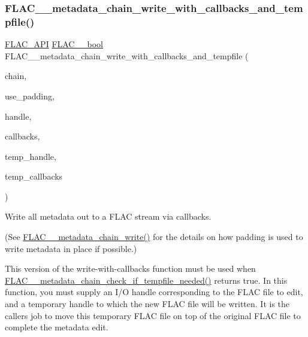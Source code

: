 \subsubsection{\texorpdfstring{F\+L\+A\+C\+\_\+\+\_\+metadata\+\_\+chain\+\_\+write\+\_\+with\+\_\+callbacks\+\_\+and\+\_\+tempfile()}{FLAC\_\_metadata\_chain\_write\_with\_callbacks\_and\_tempfile()}}
{\footnotesize\ttfamily \hyperlink{group__flac__export_ga56ca07df8a23310707732b1c0007d6f5}{F\+L\+A\+C\+\_\+\+A\+PI} \hyperlink{ordinals_8h_a95103469f1cbd78b8cf250194985b34e}{F\+L\+A\+C\+\_\+\+\_\+bool} F\+L\+A\+C\+\_\+\+\_\+metadata\+\_\+chain\+\_\+write\+\_\+with\+\_\+callbacks\+\_\+and\+\_\+tempfile (\begin{DoxyParamCaption}\item[{\hyperlink{group__flac__metadata__level2_gaec6993c60b88f222a52af86f8f47bfdf}{F\+L\+A\+C\+\_\+\+\_\+\+Metadata\+\_\+\+Chain} $\ast$}]{chain,  }\item[{\hyperlink{ordinals_8h_a95103469f1cbd78b8cf250194985b34e}{F\+L\+A\+C\+\_\+\+\_\+bool}}]{use\+\_\+padding,  }\item[{\hyperlink{group__flac__callbacks_ga4c329c3168dee6e352384c5e9306260d}{F\+L\+A\+C\+\_\+\+\_\+\+I\+O\+Handle}}]{handle,  }\item[{\hyperlink{struct_f_l_a_c_____i_o_callbacks}{F\+L\+A\+C\+\_\+\+\_\+\+I\+O\+Callbacks}}]{callbacks,  }\item[{\hyperlink{group__flac__callbacks_ga4c329c3168dee6e352384c5e9306260d}{F\+L\+A\+C\+\_\+\+\_\+\+I\+O\+Handle}}]{temp\+\_\+handle,  }\item[{\hyperlink{struct_f_l_a_c_____i_o_callbacks}{F\+L\+A\+C\+\_\+\+\_\+\+I\+O\+Callbacks}}]{temp\+\_\+callbacks }\end{DoxyParamCaption})}

Write all metadata out to a F\+L\+AC stream via callbacks.

(See \hyperlink{group__flac__metadata__level2_gaa15ead7230217de8e79f4af822cda490}{F\+L\+A\+C\+\_\+\+\_\+metadata\+\_\+chain\+\_\+write()} for the details on how padding is used to write metadata in place if possible.)

This version of the write-\/with-\/callbacks function must be used when \hyperlink{group__flac__metadata__level2_ga29a124cceaffce5376d073a032bd1c52}{F\+L\+A\+C\+\_\+\+\_\+metadata\+\_\+chain\+\_\+check\+\_\+if\+\_\+tempfile\+\_\+needed()} returns true. In this function, you must supply an I/O handle corresponding to the F\+L\+AC file to edit, and a temporary handle to which the new F\+L\+AC file will be written. It is the caller\textquotesingle{}s job to move this temporary F\+L\+AC file on top of the original F\+L\+AC file to complete the metadata edit.


